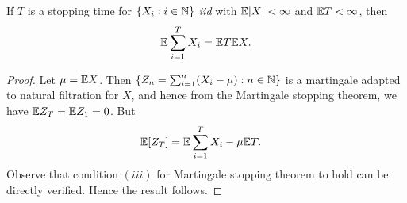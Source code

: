 \documentclass[a4paper,10pt,english]{article}
\begin{document}
\begin{thm}
\begin{cor} 
If $T$ is a stopping time for $\{X_i: i \in \mathbb{N}\}$ \textit{iid} with $\mathbb{E}|X|< \infty$ and $\mathbb{E} T < \infty$, then
\begin{align*}
\mathbb{E}\sum_{i=1}^{T}X_i =\mathbb{E} T\mathbb{E} X.
\end{align*}
\end{cor}
\begin{proof}
Let $\mu=\mathbb{E} X$. Then $\{Z_n = \sum_{i=1}^{n}(X_i-\mu): n \in \mathbb{N}\}$ is a martingale adapted to natural filtration for $X$,  and hence from the Martingale stopping theorem, we have $\mathbb{E} Z_T =\mathbb{E} Z_1=0$. 
But 
\begin{align*}
\E[Z_T] %
&=\E\sum_{i=1}^T X_i- \mu\E T.
\end{align*}
Observe that condition $(iii)$  for Martingale stopping theorem to hold can be directly verified. 
Hence the result follows. 
\end{proof}

\end{thm}
\end{document}
